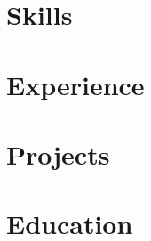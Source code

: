 \documentclass[letter,10pt]{article}
\begin{document}


\section{Skills}



\section{Experience}




\section{Projects}


\section{Education}





\end{document}
